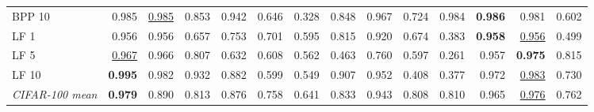 \begin{table}[htbp]
\begin{adjustbox}{max width=\linewidth}
\begin{tabular}{lrrrrrrrrrrrrr}
BPP 10 & 0.985 & \underline{0.985} & 0.853 & 0.942 & 0.646 & \textcolor{black!45}{0.328} & 0.848 & 0.967 & 0.724 & 0.984 & \textbf{0.986} & 0.981 & 0.602 \\
LF 1 & 0.956 & 0.956 & 0.657 & 0.753 & 0.701 & 0.595 & 0.815 & 0.920 & 0.674 & \textcolor{black!45}{0.383} & \textbf{0.958} & \underline{0.956} & \textcolor{black!45}{0.499} \\
LF 5 & \underline{0.967} & 0.966 & 0.807 & 0.632 & 0.608 & 0.562 & \textcolor{black!45}{0.463} & 0.760 & 0.597 & \textcolor{black!45}{0.261} & 0.957 & \textbf{0.975} & 0.815 \\
LF 10 & \textbf{0.995} & 0.982 & 0.932 & 0.882 & 0.599 & 0.549 & 0.907 & 0.952 & \textcolor{black!45}{0.408} & \textcolor{black!45}{0.377} & 0.972 & \underline{0.983} & 0.730 \\
\rowcolor{black!8}\emph{CIFAR-100 mean} & \textbf{0.979} & 0.890 & 0.813 & 0.876 & 0.758 & 0.641 & 0.833 & 0.943 & 0.808 & 0.810 & 0.965 & \underline{0.976} & 0.762 \\
\bottomrule
\end{tabular}
\end{adjustbox}
\end{table}
